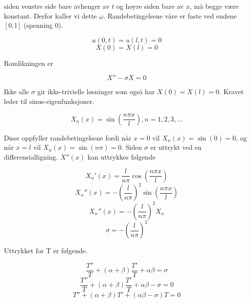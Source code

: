 siden venstre side bare avhenger av $t$ og høyre siden bare av $x$, må begge være konstant. Derfor kaller vi dette $\omega$. Randebetingelsene våre er faste ved endene $[0, \mathrm{l}]$ (spenning 0).

\begin{equation}
    u(0,t)=u(l,t)=0
\end{equation}
\begin{equation}
    X(0)=X(l)=0
\end{equation}

Romlikningen er

\begin{equation}
    X'' - \sigma X = 0
\end{equation}

Ikke alle $\sigma$ gir ikke-trivielle løsninger som også har $X(0) = X(l) = 0$. Kravet leder til sinus-eigenfunksjoner.

\begin{equation}
    X_n(x) = \sin(\frac{n \pi x}{l}), n = 1,2,3,...
\end{equation}

Disse oppfyller randebetingelsene fordi når $x = 0$ vil $X_n(x) = \sin(0) = 0$, og når $x = l$ vil $X_n(x) = \sin(n\pi) = 0$. Siden $\sigma$ er uttrykt ved en differensialligning. $X''(x)$ kan uttrykkes følgende

\begin{equation}
    X_n'(x) = \frac{l}{n\pi}\cos(\frac{n\pi x}{l})
\end{equation}
\begin{equation}
    X_n''(x) = -(\frac{l}{n\pi})^2\sin(\frac{n\pi x}{l})
\end{equation}
\begin{equation}
    X_n''(x) = -(\frac{l}{n\pi})^2 X_n
\end{equation}
\begin{equation}
    \sigma = -(\frac{l}{n\pi})^2
\end{equation}

Uttrykket for T er følgende.

\begin{equation}
    \frac{T''}{T} + (\alpha + \beta)\frac{T'}{T} + \alpha \beta = \sigma
\end{equation}
\begin{equation}
    \frac{T''}{T} + (\alpha + \beta)\frac{T'}{T} + \alpha \beta - \sigma = 0
\end{equation}
\begin{equation}
    T'' + (\alpha + \beta)T' + (\alpha \beta - \sigma)T = 0
\end{equation}

